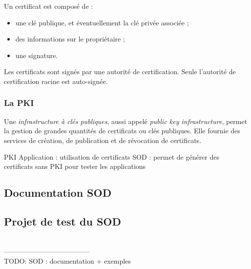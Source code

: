 Un certificat est composé de :
\begin{itemize}
	\item une clé publique, et éventuellement la clé privée associée ;
	\item des informations sur le propriétaire ;
	\item une signature.
\end{itemize}

Les certificats sont signés par une autorité de certification.
Seule l'autorité de certification racine est auto-signée.


\subsubsection{La PKI}

Une \textit{infrastructure à clés publiques}, aussi appelé \textit{public key infrastructure}, permet la gestion de grandes quantités de certificats ou clés publiques.
Elle fournie des services de création, de publication et de révocation de certificats.








PKI
Application : utilisation de certificats
SOD : permet de générer des certificats sans PKI pour tester les applications


\subsection{Documentation SOD}


\subsection{Projet de test du SOD}



~~\\--------------------------------------~~\\
TODO:
SOD : documentation + exemples